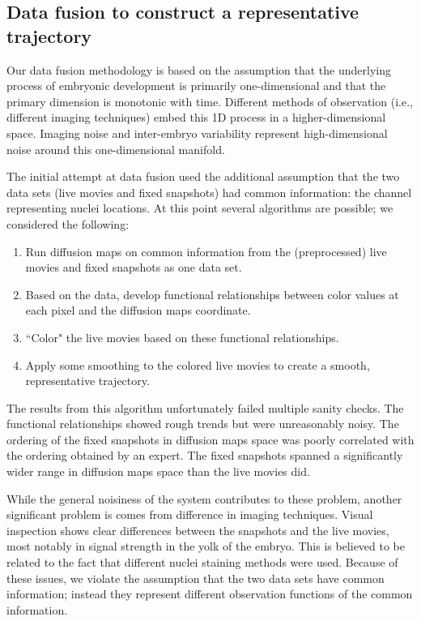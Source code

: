 \documentclass[12pt]{article}
\begin{document}
\subsection{Data fusion to construct a representative trajectory}

Our data fusion methodology is based on the assumption that the underlying process of embryonic development is primarily one-dimensional and that the primary dimension is monotonic with time. Different methods of observation (i.e., different imaging techniques) embed this 1D process in a higher-dimensional space. Imaging noise and inter-embryo variability represent high-dimensional noise around this one-dimensional manifold. \vspace{1mm}

The initial attempt at data fusion used the additional assumption that the two data sets (live movies and fixed snapshots) had common information: the channel representing nuclei locations. At this point several algorithms are possible; we considered the following:

\begin{enumerate}
\item Run diffusion maps on common information from the (preprocessed) live movies and fixed snapshots as one data set.
\item Based on the data, develop functional relationships between color values at each pixel and the diffusion maps coordinate.
\item ``Color" the live movies based on these functional relationships.
\item Apply some smoothing to the colored live movies to create a smooth, representative trajectory.
\end{enumerate}

The results from this algorithm unfortunately failed multiple sanity checks. The functional relationships showed rough trends but were unreasonably noisy. The ordering of the fixed snapshots in diffusion maps space was poorly correlated with the ordering obtained by an expert. The fixed snapshots spanned a significantly wider range in diffusion maps space than the live movies did. \vspace{1mm}

While the general noisiness of the system contributes to these problem, another significant problem is comes from difference in imaging techniques. Visual inspection shows clear differences between the snapshots and the live movies, most notably in signal strength in the yolk of the embryo. This is believed to be related to the fact that different nuclei staining methods were used. Because of these issues, we violate the assumption that the two data sets have common information; instead they represent different observation functions of the common information. \vspace{1mm}
\end{document}
